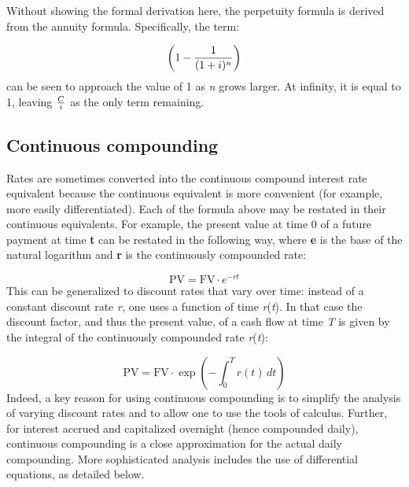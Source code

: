 Without showing the formal derivation here, the perpetuity formula is derived from the
annuity formula. Specifically, the term:



$$\left({1 - {1 \over { (1+i)^n } }}\right)$$ can be seen to approach the value of 1 as
\textit{n} grows larger. At infinity, it is equal to 1, leaving ${C \over i}$ as the only
term remaining.




\subsection{Continuous compounding}
\label{sss:cont-9115}




Rates are sometimes converted into the continuous compound interest rate equivalent
because the continuous equivalent is more convenient (for example, more easily
differentiated). Each of the formula above may be restated in their continuous
equivalents. For example, the present value at time 0 of a future payment at time
\textbf{t} can be restated in the following way, where \textbf{e} is the base of the
natural logarithm and \textbf{r} is the continuously compounded rate:



$$\text{PV}  = \text{FV}\cdot e^{-rt}$$ This can be generalized to discount rates that
vary over time: instead of a constant discount rate \textit{r,} one uses a function of
time \textit{r}(\textit{t}). In that case the discount factor, and thus the present value,
of a cash flow at time \textit{T} is given by the integral of the continuously compounded
rate \textit{r}(\textit{t}):



$$\text{PV}  = \text{FV}\cdot \exp\left(-\int_0^T r(t)\,dt\right)$$ Indeed, a key reason
for using continuous compounding is to simplify the analysis of varying discount rates and
to allow one to use the tools of calculus. Further, for interest accrued and capitalized
overnight (hence compounded daily), continuous compounding is a close approximation for
the actual daily compounding. More sophisticated analysis includes the use of differential
equations, as detailed below.





